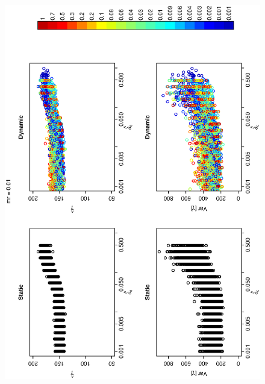 \documentclass[12pt]{article}
\begin{document}
\begin{figure}[hb!]
\hspace{-0.5 in}\includegraphics[width=5in,angle=-90]{./figures/radius_vs_gamma_5_4.eps}
\caption{}
\label{fig:Figure6}
\end{figure}
\end{document}
